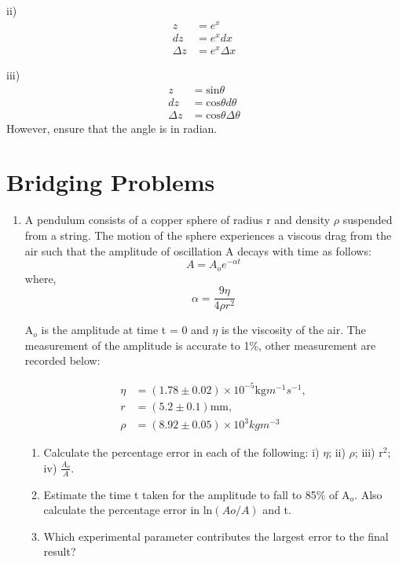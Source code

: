 \begin{enumerate}
    ii) 
    \begin{align*}
        z &= e^x\\
        dz &= e^x dx \\
        \Delta z &= e^x \Delta x 
    \end{align*}
    
    iii) 
    \begin{align*}
        z &= \text{sin}\theta\\
        dz &= \text{cos}\theta d\theta\\
        \Delta z &= \text{cos}\theta \Delta \theta
    \end{align*}
    However, ensure that the angle is in radian. 
\end{enumerate}
\section{Bridging Problems}
\begin{enumerate}
    \item A pendulum consists of a copper sphere of radius r and density $\rho$ suspended from a string. The motion of the sphere experiences a viscous drag from the air such that the amplitude of oscillation A decays with time as follows:\\
    \[A = A_oe^{-\alpha t}\]\hspace{1 cm}where, \[\alpha = \frac{9\eta}{4\rho r^2}\]
    
    A$_o$ is the amplitude at time t = 0 and $\eta$ is the viscosity of the air. The measurement of the amplitude is accurate to 1\%, other measurement are recorded below: 
    
    \begin{align*}
        \eta &= (1.78 \pm 0.02) \times 10^{-5} \text{kg} m^{-1} s^{-1}, \\
        r &= (5.2 \pm 0.1) \text{mm,}\\ 
        \rho &= (8.92 \pm 0.05) \times 10^3 kg m^{-3} 
    \end{align*}
    \begin{enumerate}
        \item 	Calculate the percentage error in each of the following: i) $\eta$; ii) $\rho$; iii) r$^2$; iv) $\frac{A_o}{A}$.
        
        \item 	Estimate the time t taken for the amplitude to fall to 85\% of A$_o$. Also calculate the percentage error in ln$\left(Ao/A\right)$ and t. 
        
        \item Which experimental parameter contributes the largest error to the final result?
    \end{enumerate}
\end{enumerate}   
